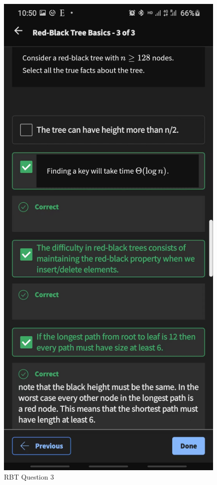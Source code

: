 \documentclass{article}
\begin{document}
\begin{figure}[H]
    \includegraphics[width=\textwidth]{rbtquiz03.jpg}
    \caption{RBT Question 3}
\end{figure}
\end{document}
